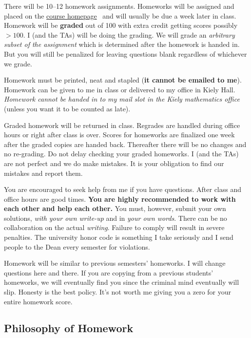 \documentclass[12pt]{article}
\newcommand{\ingreen}[1]{\color{green}\textbf{#1} \color{black}}
\newcommand{\coursewebpage}{\href{https://github.com/kapelner/QC_Math_241_Fall_2016}{course homepage}}
\begin{document}
There will be 10--12 homework assignments. Homeworks will be assigned and placed on the \coursewebpage~ and will usually be due a week later in class. Homework will be \textbf{graded} out of 100 with extra credit getting scores possibly $> 100$. I (and the TAs) will be doing the grading. We will grade an \textit{arbitrary subset of the assignment} which is determined after the homework is handed in. But you will still be penalized for leaving questions blank regardless of whichever we grade. 

Homework must be printed, neat and stapled (\textbf{it cannot be emailed to me}). Homework can be given to me in class or delivered to my office in Kiely Hall. \textit{Homework cannot be handed in to my mail slot in the Kiely mathematics office} (unless you want it to be counted as late).

Graded homework will be returned in class. Regrades are handled during office hours or right after class is over. Scores for homeworks are finalized one week after the graded copies are handed back. Thereafter there will be no changes and no re-grading. Do not delay checking your graded homeworks. I (and the TAs) are not perfect and we do make mistakes. It is your obligation to find our mistakes and report them.

You are encouraged to seek help from me if you have questions. After class and office hours are good times. \ingreen{You are highly recommended to work with each other and help each other.} You must, however, submit your own solutions, \textit{with your own write-up} and in \textit{your own words}. There can be no collaboration on the actual \textit{writing}. Failure to comply will result in severe penalties. The university honor code is something I take seriously and I send people to the Dean every semester for violations.

Homework will be similar to previous semesters' homeworks. I will change questions here and there. If you are copying from a previous students' homeworks, we will eventually find you since the criminal mind eventually will slip. Honesty is the best policy. It's not worth me giving you a zero for your entire homework score.

\subsection*{Philosophy of Homework}
\end{document}
